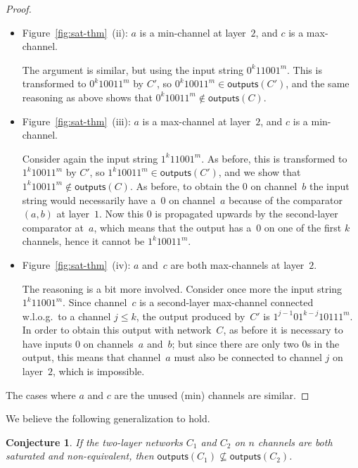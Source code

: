 \documentclass[10pt]{IEEEtran}
\newcommand{\outputs}{\mathsf{outputs}}
\newtheorem{conjecture}{Conjecture}
\begin{document}
\begin{proof}
\begin{itemize}
  \item Figure~\ref{fig:sat-thm}~(ii): $a$ is a min-channel at layer~$2$, and $c$ is a max-channel.

    The argument is similar, but using the
    input string $0^k11001^m$.  This is transformed to $0^k10011^m$ by $C'$, so
    $0^k10011^m\in\outputs(C')$, and the same reasoning as above shows that
    $0^k10011^m\not\in\outputs(C)$.

  \item Figure~\ref{fig:sat-thm}~(iii): $a$ is a max-channel at layer~$2$, and $c$ is a min-channel.

    Consider again the input string $1^k11001^m$.  As before, this is
    transformed to $1^k10011^m$ by $C'$, so $1^k10011^m\in\outputs(C')$, and we
    show that $1^k10011^m\not\in\outputs(C)$.  As before, to obtain the $0$ on
    channel~$b$ the input string would necessarily have a~$0$ on channel~$a$ because
    of the comparator~$(a,b)$ at layer~$1$.  Now this $0$ is propagated upwards
    by the second-layer comparator at~$a$, which means that the output has
    a~$0$ on one of the first $k$ channels, hence it cannot be $1^k10011^m$.

  \item Figure~\ref{fig:sat-thm}~(iv): $a$ and~$c$ are both max-channels at layer~$2$.

    The reasoning is a bit more involved.
    Consider once more the input string $1^k11001^m$.  Since channel~$c$ is a
    second-layer max-channel connected w.l.o.g.~to a channel $j \leq k$, the output produced by~$C'$ is
    $1^{j-1}01^{k-j}10111^m$. In
    order to obtain this output with network~$C$, as before it is necessary to
    have inputs $0$ on channels~$a$ and~$b$; but since there are only two $0$s in
    the output, this means that channel~$a$ must also be connected to channel $j$
    on layer~$2$, which is impossible.
  \end{itemize}

\noindent  The cases where $a$ and $c$ are the unused (min) channels are similar.
\end{proof}


We believe the following generalization to hold.

\begin{conjecture}\label{conjecture}
  If the two-layer networks $C_1$ and $C_2$ on $n$ channels are both saturated and
  non-equivalent, then $\outputs(C_1)\not\subseteq\outputs(C_2)$.
\end{conjecture}
\end{document}
